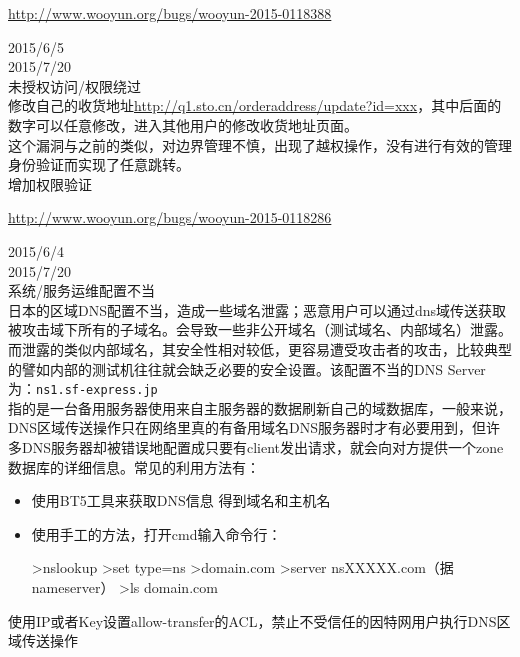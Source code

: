 \documentclass{leptc}
\begin{document}
\begin{center}
\end{center}
\begin{center}
	\url{http://www.wooyun.org/bugs/wooyun-2015-0118388}
\end{center}
 2015/6/5 \\
 2015/7/20 \\
 未授权访问/权限绕过 \\
 修改自己的收货地址\url{http://q1.sto.cn/orderaddress/update?id=xxx}，其中后面的数字可以任意修改，进入其他用户的修改收货地址页面。\\
 这个漏洞与之前的类似，对边界管理不慎，出现了越权操作，没有进行有效的管理身份验证而实现了任意跳转。\\
 增加权限验证 \\

\begin{center}
	\url{http://www.wooyun.org/bugs/wooyun-2015-0118286}
\end{center}
 2015/6/4 \\
 2015/7/20 \\
 系统/服务运维配置不当 \\
 日本的区域DNS配置不当，造成一些域名泄露；恶意用户可以通过dns域传送获取被攻击域下所有的子域名。会导致一些非公开域名（测试域名、内部域名）泄露。而泄露的类似内部域名，其安全性相对较低，更容易遭受攻击者的攻击，比较典型的譬如内部的测试机往往就会缺乏必要的安全设置。该配置不当的DNS Server为：\verb|ns1.sf-express.jp|\\
 指的是一台备用服务器使用来自主服务器的数据刷新自己的域数据库，一般来说，DNS区域传送操作只在网络里真的有备用域名DNS服务器时才有必要用到，但许多DNS服务器却被错误地配置成只要有client发出请求，就会向对方提供一个zone数据库的详细信息。常见的利用方法有：
\begin{itemize}
	\item 使用BT5工具来获取DNS信息 得到域名和主机名
	\item 使用手工的方法，打开cmd输入命令行：
	\begin{verbatimtab}
		>nslookup
		>set type=ns
		>domain.com
		>server nsXXXXX.com（据nameserver）
		>ls  domain.com
	\end{verbatimtab}
\end{itemize}
 使用IP或者Key设置allow-transfer的ACL，禁止不受信任的因特网用户执行DNS区域传送操作\\
\end{document}
